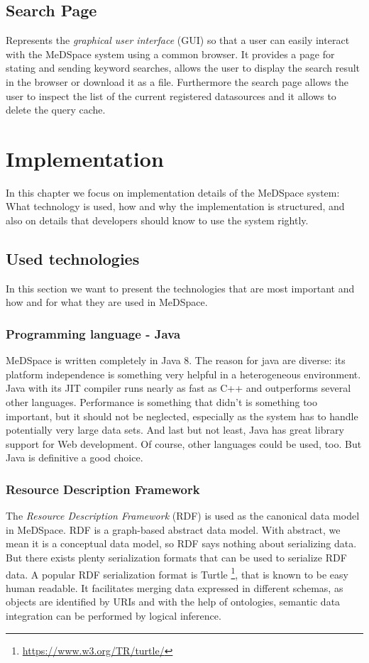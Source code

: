 \section{Search Page}
Represents the \emph{graphical user interface} (GUI) so that a user can easily interact with the MeDSpace system using a common browser. It provides a page for stating and sending keyword searches, allows the user to display the search result in the browser or download it as a file. Furthermore the search page allows the user to inspect the list of the current registered datasources and it allows to delete the query cache.

\chapter{Implementation}
In this chapter we focus on implementation details of the MeDSpace system: What technology is used, how and why the implementation is structured, and also on details that developers should know to use the system rightly.

\section{Used technologies}

In this section we want to present the technologies that are most important and how and for what they are used in MeDSpace.

\subsection{Programming language - Java}
MeDSpace is written completely in Java 8. The reason for java are diverse: its platform independence is something very helpful in a heterogeneous environment. Java with its JIT compiler runs nearly as fast as C++ and outperforms several other languages. Performance is something that didn't is something too important, but it should not be neglected, especially as the system has to handle potentially very large data sets. And last but not least, Java has great library support for Web development. 
Of course, other languages could be used, too. But Java is definitive a good choice.

\subsection{Resource Description Framework}

The \emph{Resource Description Framework} (RDF) \cite{w3RDF} is used as the canonical data model in MeDSpace. RDF is a graph-based abstract data model. With abstract, we mean it is a conceptual data model, so RDF says nothing about serializing data. But there exists plenty serialization formats that can be used to serialize RDF data. A popular RDF serialization format is Turtle \footnote{\url{https://www.w3.org/TR/turtle/}}, that is known to be easy human readable.
It facilitates merging data expressed in different schemas, as objects are identified by URIs and with the help of ontologies, semantic data integration can be performed by logical inference. 

